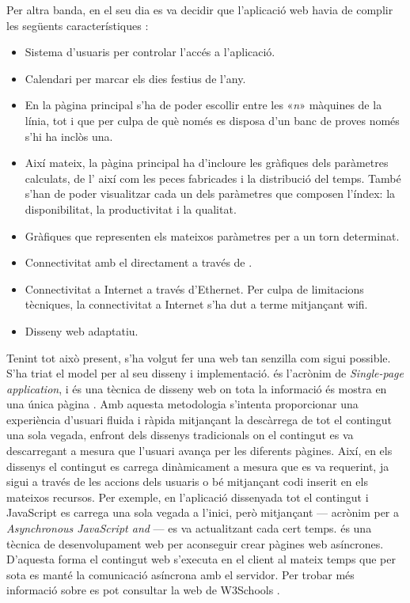 \documentclass{tfgitic}[2022/06/30]
\begin{document}
Per altra banda, en el seu dia es va decidir que l'aplicació web havia de complir les següents característiques \cite{milloresProto}:

\begin{itemize}
    \item Sistema d'usuaris per controlar l'accés a l'aplicació.
    \item Calendari per marcar els dies festius de l'any.
    \item En la pàgina principal s'ha de poder escollir entre les «\emph{n}» màquines de la línia, tot i
que per culpa de què només es disposa d'un banc de proves només s'hi ha inclòs una.
    \item Així mateix, la pàgina principal ha d'incloure les gràfiques dels paràmetres calculats, de l' així com les peces fabricades i la distribució del temps. També s'han de poder visualitzar cada un dels paràmetres que composen l'índex: la disponibilitat, la productivitat i la qualitat.
    \item Gràfiques que representen els mateixos paràmetres per a un torn determinat.
    \item Connectivitat amb el  directament a través de .
    \item Connectivitat a Internet a través d'Ethernet. Per culpa de limitacions tècniques, la connectivitat a Internet s'ha dut a terme mitjançant wifi.
    \item Disseny web adaptatiu.
\end{itemize}

Tenint tot això present, s'ha volgut fer una web tan senzilla com sigui possible. S'ha triat el model  per al seu disseny i implementació.  és l'acrònim de \emph{Single-page application}, i és una tècnica de disseny web on tota la informació és mostra en una única pàgina \cite{Flanagan:spa}. Amb aquesta metodologia s'intenta proporcionar una experiència d'usuari fluida i ràpida mitjançant la descàrrega de tot el contingut una sola vegada, enfront dels dissenys tradicionals on el contingut es va descarregant a mesura que l'usuari avança per les diferents pàgines. Així, en els dissenys  el contingut es carrega dinàmicament a mesura que es va requerint, ja sigui a través de les accions dels usuaris o bé mitjançant codi inserit en els mateixos recursos. Per exemple, en l'aplicació dissenyada tot el contingut  i JavaScript es carrega una sola vegada a l'inici, però mitjançant  --- acrònim per a \emph{Asynchronous JavaScript and } --- es va actualitzant cada cert temps.  és una tècnica de desenvolupament web per aconseguir crear pàgines web asíncrones. D'aquesta forma el contingut web s'executa en el client al mateix temps que per sota es manté la comunicació asíncrona amb el servidor. Per trobar més informació sobre  es pot consultar la web de W3Schools \cite{w3schools:ajax}.
\end{document}

